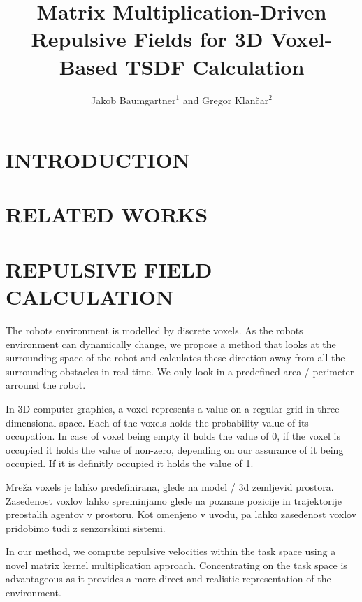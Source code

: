 \documentclass[letterpaper, 10 pt, conference]{ieeeconf}  %
\title{\LARGE \bf
Matrix Multiplication-Driven Repulsive Fields for 3D Voxel-Based TSDF Calculation
}
\author{
	Jakob Baumgartner$^{1}$ and Gregor Klančar$^{2}$%
}
\begin{document}
\maketitle
\thispagestyle{empty}
\pagestyle{empty}


\begin{abstract}



\end{abstract}


\section{INTRODUCTION}

\section{RELATED WORKS}

\section{REPULSIVE FIELD CALCULATION}

The robots environment is modelled by discrete voxels. As the robots environment can dynamically change, we propose a method that looks at the surrounding space of the robot and calculates these direction away from all the surrounding obstacles in real time. We only look in a predefined area / perimeter arround the robot.  

In 3D computer graphics, a voxel represents a value on a regular grid in three-dimensional space. Each of the voxels holds the probability value of its occupation. In case of voxel being empty it holds the value of 0, if the voxel is occupied it holds the value of non-zero, depending on our assurance of it being occupied. If it is definitly occupied it holds the value of 1. 

Mreža voxels je lahko predefinirana, glede na model / 3d zemljevid prostora. Zasedenost voxlov lahko spreminjamo glede na poznane pozicije in trajektorije preostalih agentov v prostoru. Kot omenjeno v uvodu, pa lahko zasedenost voxlov pridobimo tudi z senzorskimi sistemi. 

In our method, we compute repulsive velocities within the task space using a novel matrix kernel multiplication approach. Concentrating on the task space is advantageous as it provides a more direct and realistic representation of the environment. 
\end{document}
